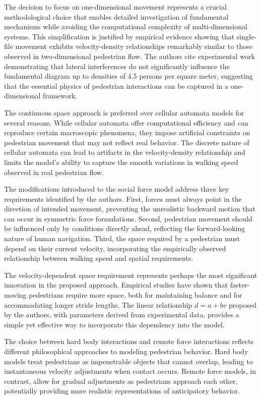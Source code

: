 \documentclass[12pt,a4paper]{article}
\begin{document}
The decision to focus on one-dimensional movement represents a crucial methodological choice that enables detailed investigation of fundamental mechanisms while avoiding the computational complexity of multi-dimensional systems. This simplification is justified by empirical evidence showing that single-file movement exhibits velocity-density relationships remarkably similar to those observed in two-dimensional pedestrian flow. The authors cite experimental work demonstrating that lateral interferences do not significantly influence the fundamental diagram up to densities of 4.5 persons per square meter, suggesting that the essential physics of pedestrian interactions can be captured in a one-dimensional framework.

The continuous space approach is preferred over cellular automata models for several reasons. While cellular automata offer computational efficiency and can reproduce certain macroscopic phenomena, they impose artificial constraints on pedestrian movement that may not reflect real behavior. The discrete nature of cellular automata can lead to artifacts in the velocity-density relationship and limits the model's ability to capture the smooth variations in walking speed observed in real pedestrian flow.

The modifications introduced to the social force model address three key requirements identified by the authors. First, forces must always point in the direction of intended movement, preventing the unrealistic backward motion that can occur in symmetric force formulations. Second, pedestrian movement should be influenced only by conditions directly ahead, reflecting the forward-looking nature of human navigation. Third, the space required by a pedestrian must depend on their current velocity, incorporating the empirically observed relationship between walking speed and spatial requirements.

The velocity-dependent space requirement represents perhaps the most significant innovation in the proposed approach. Empirical studies have shown that faster-moving pedestrians require more space, both for maintaining balance and for accommodating longer stride lengths. The linear relationship $d = a + bv$ proposed by the authors, with parameters derived from experimental data, provides a simple yet effective way to incorporate this dependency into the model.

The choice between hard body interactions and remote force interactions reflects different philosophical approaches to modeling pedestrian behavior. Hard body models treat pedestrians as impenetrable objects that cannot overlap, leading to instantaneous velocity adjustments when contact occurs. Remote force models, in contrast, allow for gradual adjustments as pedestrians approach each other, potentially providing more realistic representations of anticipatory behavior.
\end{document}

